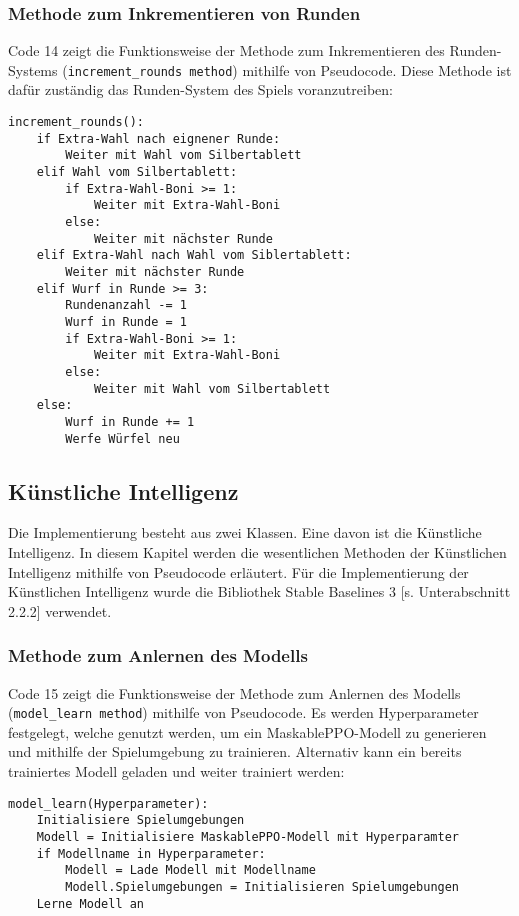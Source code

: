 \subsubsection{Methode zum Inkrementieren von Runden}
\begin{minipage}{\linewidth}
Code 14 zeigt die Funktionsweise der Methode zum Inkrementieren des Runden-Systems (\texttt{increment\_rounds method}) mithilfe von Pseudocode. Diese Methode ist dafür zuständig das Runden-System des Spiels voranzutreiben:
\vspace{0.5cm}
\begin{lstlisting}[caption={Methode zum Inkrementieren des Runden-Systems}]
increment_rounds():
	if Extra-Wahl nach eignener Runde:
		Weiter mit Wahl vom Silbertablett
	elif Wahl vom Silbertablett:
		if Extra-Wahl-Boni >= 1:
			Weiter mit Extra-Wahl-Boni
		else:
			Weiter mit nächster Runde
	elif Extra-Wahl nach Wahl vom Siblertablett:
		Weiter mit nächster Runde
	elif Wurf in Runde >= 3:
		Rundenanzahl -= 1
		Wurf in Runde = 1
		if Extra-Wahl-Boni >= 1:
			Weiter mit Extra-Wahl-Boni
		else:
			Weiter mit Wahl vom Silbertablett
	else:
		Wurf in Runde += 1
		Werfe Würfel neu
\end{lstlisting}
\end{minipage}
\subsection{Künstliche Intelligenz}
Die Implementierung besteht aus zwei Klassen. Eine davon ist die Künstliche Intelligenz. In diesem Kapitel werden die wesentlichen Methoden der Künstlichen Intelligenz mithilfe von Pseudocode erläutert. Für die Implementierung der Künstlichen Intelligenz wurde die Bibliothek Stable Baselines 3 [s. Unterabschnitt 2.2.2] verwendet.
\subsubsection{Methode zum Anlernen des Modells}
\begin{minipage}{\linewidth}
Code 15 zeigt die Funktionsweise der Methode zum Anlernen des Modells (\texttt{model\_learn method}) mithilfe von Pseudocode. Es werden Hyperparameter festgelegt, welche genutzt werden, um ein MaskablePPO-Modell zu generieren und mithilfe der Spielumgebung zu trainieren. Alternativ kann ein bereits trainiertes Modell geladen und weiter trainiert werden:
\vspace{0.5cm}
\begin{lstlisting}[caption={Methode zu Anlernen des Modells},morekeywords={Hyperparameter}]
model_learn(Hyperparameter):
	Initialisiere Spielumgebungen
	Modell = Initialisiere MaskablePPO-Modell mit Hyperparamter
	if Modellname in Hyperparameter:
		Modell = Lade Modell mit Modellname
		Modell.Spielumgebungen = Initialisieren Spielumgebungen
	Lerne Modell an
\end{lstlisting}
\end{minipage}
